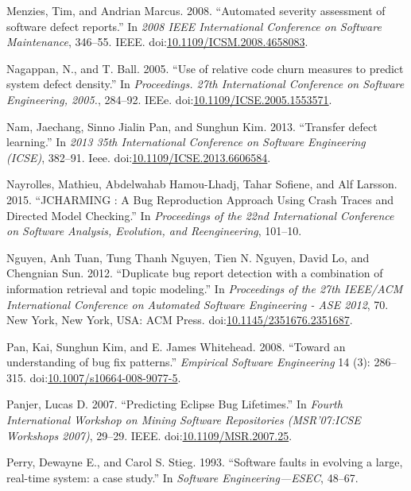 \documentclass[natbib]{svjour3}
\begin{document}
\hypertarget{ref-Menzies2008}{}
Menzies, Tim, and Andrian Marcus. 2008. ``Automated severity assessment
of software defect reports.'' In \emph{2008 IEEE International
Conference on Software Maintenance}, 346--55. IEEE.
doi:\href{https://doi.org/10.1109/ICSM.2008.4658083}{10.1109/ICSM.2008.4658083}.

\hypertarget{ref-Nagappan}{}
Nagappan, N., and T. Ball. 2005. ``Use of relative code churn measures
to predict system defect density.'' In \emph{Proceedings. 27th
International Conference on Software Engineering, 2005.}, 284--92. IEEe.
doi:\href{https://doi.org/10.1109/ICSE.2005.1553571}{10.1109/ICSE.2005.1553571}.

\hypertarget{ref-Nam2013}{}
Nam, Jaechang, Sinno Jialin Pan, and Sunghun Kim. 2013. ``Transfer
defect learning.'' In \emph{2013 35th International Conference on
Software Engineering (ICSE)}, 382--91. Ieee.
doi:\href{https://doi.org/10.1109/ICSE.2013.6606584}{10.1109/ICSE.2013.6606584}.

\hypertarget{ref-Nayrolles2015}{}
Nayrolles, Mathieu, Abdelwahab Hamou-Lhadj, Tahar Sofiene, and Alf
Larsson. 2015. ``JCHARMING : A Bug Reproduction Approach Using Crash
Traces and Directed Model Checking.'' In \emph{Proceedings of the 22nd
International Conference on Software Analysis, Evolution, and
Reengineering}, 101--10.

\hypertarget{ref-Nguyen2012}{}
Nguyen, Anh Tuan, Tung Thanh Nguyen, Tien N. Nguyen, David Lo, and
Chengnian Sun. 2012. ``Duplicate bug report detection with a combination
of information retrieval and topic modeling.'' In \emph{Proceedings of
the 27th IEEE/ACM International Conference on Automated Software
Engineering - ASE 2012}, 70. New York, New York, USA: ACM Press.
doi:\href{https://doi.org/10.1145/2351676.2351687}{10.1145/2351676.2351687}.

\hypertarget{ref-Pan2008}{}
Pan, Kai, Sunghun Kim, and E. James Whitehead. 2008. ``Toward an
understanding of bug fix patterns.'' \emph{Empirical Software
Engineering} 14 (3): 286--315.
doi:\href{https://doi.org/10.1007/s10664-008-9077-5}{10.1007/s10664-008-9077-5}.

\hypertarget{ref-Panjer2007}{}
Panjer, Lucas D. 2007. ``Predicting Eclipse Bug Lifetimes.'' In
\emph{Fourth International Workshop on Mining Software Repositories
(MSR'07:ICSE Workshops 2007)}, 29--29. IEEE.
doi:\href{https://doi.org/10.1109/MSR.2007.25}{10.1109/MSR.2007.25}.

\hypertarget{ref-PerryDewayneE.1993}{}
Perry, Dewayne E., and Carol S. Stieg. 1993. ``Software faults in
evolving a large, real-time system: a case study.'' In \emph{Software
Engineering---ESEC}, 48--67.
\end{document}
